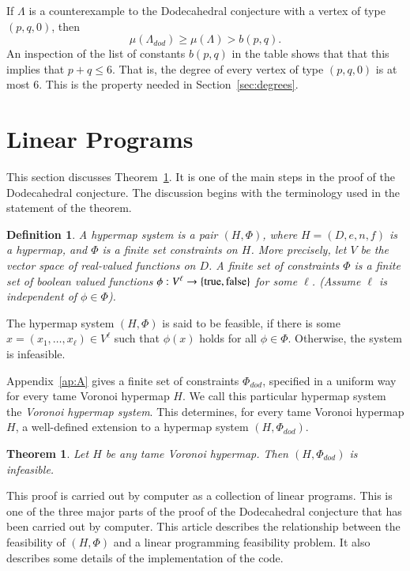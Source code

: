 \documentclass{article} %
\newtheorem{theorem}{Theorem}[section]
\newtheorem{definition}[lemma]{Definition}
\begin{document}
If $\Lambda$ is a counterexample to the Dodecahedral conjecture with a vertex
of type $(p,q,0)$, then
$$\mu(\Lambda_{dod}) \ge \mu(\Lambda) > b(p,q).$$
An inspection of the list of constants $b(p,q)$ in the table shows that that this implies
that $p+q\le 6$.  That is, the degree of every vertex of type $(p,q,0)$
is at most $6$.  This
is the property needed in Section~\ref{sec:degrees}.



\section{Linear Programs}

This section discusses Theorem~\ref{thm:graph-system}.  It is one of
the main steps in the proof of the Dodecahedral conjecture.
The discussion begins with the terminology used in the
statement of the theorem.


\begin{definition} A hypermap system is a pair $(H,\Phi)$,
where $H=(D,e,n,f)$ is a hypermap, and $\Phi$ is a finite set constraints on $H$.  More precisely, let $V$ be the vector space of
real-valued functions on $D$.  A finite set of constraints $\Phi$ is a finite
set of boolean valued functions $\phi:V^\ell\to \{{\operatorname{true}},{\operatorname{false}}\}$
for some $\ell$. (Assume $\ell$ is independent of $\phi\in \Phi$).
\end{definition}

The hypermap system $(H,\Phi)$ is said to be feasible, if
there is some $x=(x_1,\ldots,x_\ell)\in V^\ell$ such that
$\phi(x)$ holds for all $\phi\in\Phi$. Otherwise,  
the system is infeasible.

Appendix~\ref{ap:A} gives a finite set of constraints $\Phi_{dod}$, 
specified
in a uniform way for every tame Voronoi hypermap $H$.  
We call this particular hypermap system
the {\it Voronoi hypermap system}. 
This determines,
for every tame Voronoi hypermap $H$, a well-defined extension
to a hypermap system $(H,\Phi_{dod})$.   


\begin{theorem}\label{thm:graph-system}  Let 
$H$ be any tame Voronoi hypermap. 
Then $(H,\Phi_{dod})$ is infeasible.
\end{theorem}

This proof is carried out by computer as a collection of linear
programs.  This is one of the three major parts of the proof
of the Dodecahedral conjecture that has been carried out by computer.
This article describes the relationship between the
feasibility of $(H,\Phi)$ and a linear programming feasibility
problem.  It also describes some details of the implementation of 
the code.
\end{document}
